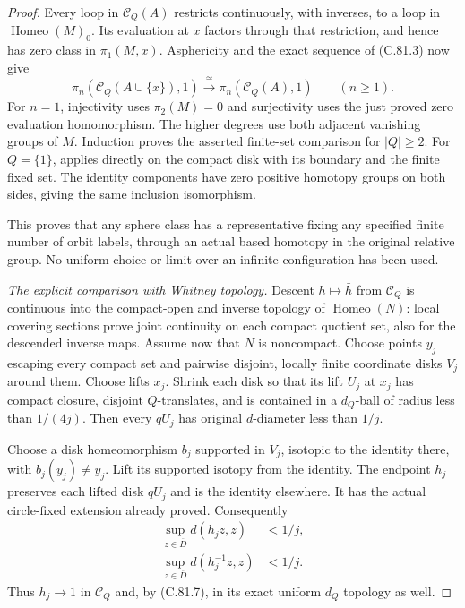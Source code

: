 \begin{proof}
Every loop in $\mathscr C_Q(A)$ restricts
continuously, with inverses, to a loop in
$\operatorname{Homeo}(M)_0$. Its evaluation
at $x$ factors through that restriction,
and hence has zero class in $\pi_1(M,x)$.
Asphericity and the exact sequence of
(C.81.3) now give
\[
 \pi_n(\mathscr C_Q(A\cup\{x\}),1)
       \xrightarrow{\ \cong\ }
 \pi_n(\mathscr C_Q(A),1)
                              \qquad(n\geq1).
                                                               \tag{C.81.12}
\]
For $n=1$, injectivity uses $\pi_2(M)=0$
and surjectivity uses the just proved zero
evaluation homomorphism. The higher degrees
use both adjacent vanishing groups of $M$.
Induction proves the asserted finite-set
comparison for $|Q|\geq2$. For $Q=\{1\}$,
\cite[Lemma~2.1(ii)]{C_Yagasaki2000} applies
directly on the compact disk with its
boundary and the finite fixed set. The
identity components have zero positive
homotopy groups on both sides, giving
the same inclusion isomorphism.

This proves that any sphere class has a
representative fixing any specified finite
number of orbit labels, through an actual
based homotopy in the original relative
group. No uniform choice or limit over
an infinite configuration has been used.

\emph{The explicit comparison with Whitney topology.}
Descent $h\mapsto\bar h$ from $\mathscr C_Q$
is continuous into the compact-open and
inverse topology of $\operatorname{Homeo}(N)$:
local covering sections prove joint continuity
on each compact quotient set, also for
the descended inverse maps.
Assume now that $N$ is noncompact. Choose
points $y_j$ escaping every compact set
and pairwise disjoint, locally finite
coordinate disks $V_j$ around them.
Choose lifts $x_j$. Shrink each disk so
that its lift $U_j$ at $x_j$ has compact
closure, disjoint $Q$-translates, and is
contained in a $d_Q$-ball of radius less
than $1/(4j)$. Then every $qU_j$ has
original $d$-diameter less than $1/j$.

Choose a disk homeomorphism $b_j$ supported
in $V_j$, isotopic to the identity there,
with $b_j(y_j)\ne y_j$. Lift its supported
isotopy from the identity. The endpoint
$h_j$ preserves each lifted disk $qU_j$
and is the identity elsewhere. It has
the actual circle-fixed extension already
proved. Consequently
\[
 \begin{split}
 \sup_{z\in\overline D}d(h_jz,z)&<1/j,\\
 \sup_{z\in\overline D}d(h_j^{-1}z,z)&<1/j.
 \end{split}
                                                               \tag{C.81.13}
\]
Thus $h_j\to1$ in $\mathscr C_Q$ and,
by (C.81.7), in its exact uniform $d_Q$
topology as well.


\end{proof}
